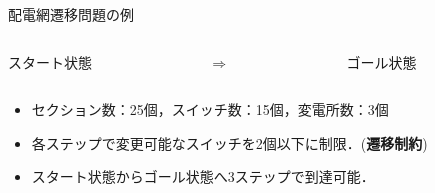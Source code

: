 \documentclass[dvipdfmx,11pt]{beamer}
\begin{document}
\begin{frame}{配電網遷移問題の例}
  \begin{columns}
    \begin{column}{0.45\textwidth}\centering
      \begin{exampleblock}{スタート状態}
    \centering
    \scalebox{0.25}{}
      \end{exampleblock}
    \end{column}
    \begin{column}{0.05\textwidth}\centering
      $\Rightarrow$
    \end{column}
    \begin{column}{0.45\textwidth}\centering
      \begin{exampleblock}{ゴール状態}
        \centering
        \scalebox{0.25}{}
      \end{exampleblock}
    \end{column}
  \end{columns}
 \vfill
 \begin{itemize}
  \item セクション数：25個，スイッチ数：15個，変電所数：3個
  \item 各ステップで変更可能なスイッチを2個以下に制限．(\textbf{遷移制約})
  \item スタート状態からゴール状態へ3ステップで到達可能．
 \end{itemize}
\end{frame}
\end{document}
